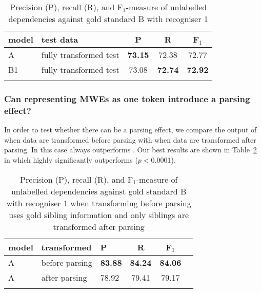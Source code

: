 \documentclass[output=paper]{langsci/langscibook}
\begin{document}
\begin{table}[h]
    \centering
    \begin{tabular}{l l c c c} %
      \lsptoprule
        \textnormal{model}
        & \textnormal{test data}
        & \textnormal{P}
        & \textnormal{R}
        & \textnormal{F$_1$}
        \\ %
        \midrule
        A & fully transformed test &\textbf{73.15}  &72.38  & 72.77 \\
        B1 & fully transformed test &73.08  &\textbf{72.74}  & \textbf{72.92} \tabularnewline %
        \lspbottomrule
    \end{tabular}
    \caption{Precision (P), recall (R), and F$_1$-measure of unlabelled dependencies against gold standard B with recogniser 1 \label{del:tab:res1bis}}
\end{table}


\subsubsection{Can representing MWEs as one token introduce a parsing effect?}
\indent In order to test whether there can be a parsing effect, we compare the output of {\modelA} when data are transformed before parsing with {\modelA} when data are transformed after parsing. In this case {\modelB} always outperforms {\modelA}. Our best results are shown in Table~\ref{del:tab:res1bisbis} in which {\modelB} highly significantly outperforms {\modelA} ($p<0.0001$).

\begin{table}[h]
    \centering
    \begin{tabular}{l l l c c c} %
      \lsptoprule
        \textnormal{model}
        & \textnormal{transformed}
        & \textnormal{P}
        & \textnormal{R}
        & \textnormal{F$_1$}
        \\ %
        \midrule
        A & before parsing &\textbf{83.88}  &\textbf{84.24}  & \textbf{84.06} \\
        A & after parsing &78.92  &79.41  & 79.17  \tabularnewline %
        \lspbottomrule
    \end{tabular}
    \caption{Precision (P), recall (R), and F$_1$-measure of unlabelled dependencies against gold standard B with recogniser 1 when transforming before parsing uses gold sibling information and only siblings are transformed after parsing\label{del:tab:res1bisbis}}
\end{table}
\end{document}
